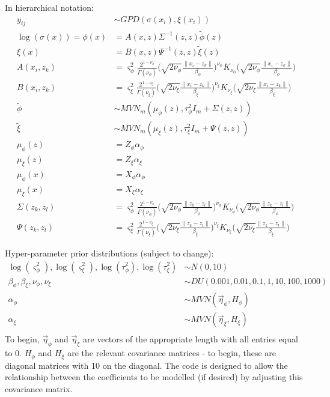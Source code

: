 \documentclass{article}
\begin{document}
In hierarchical notation:
\begin{align*}
y_{ij} &\sim GPD(\sigma(x_i), \xi(x_i)) \\
\log (\sigma (x)) = \phi(x) &= A(x, z) \Sigma^{-1}(z,z) \tilde{\phi}(z) \\
\xi (x) &= B(x, z) \Psi^{-1}(z,z) \tilde{\xi}(z) \\
A(x_i, z_k) &= \varsigma_\phi^2 \frac{2^{1-\nu_\phi}}{\Gamma(\nu_\phi)}\Bigg(\sqrt{2\nu_\phi}\frac{\|x_i - z_k\|}{\beta_\phi}\Bigg)^{\nu_\phi} K_{\nu_\phi}\Bigg(\sqrt{2\nu_\phi}\frac{\|x_i - z_k\|}{\beta_\phi}\Bigg)\\
B(x_i, z_k) &= \varsigma_\xi^2 \frac{2^{1-\nu_\xi}}{\Gamma(\nu_\xi)}\Bigg(\sqrt{2\nu_\xi}\frac{\|x_i - z_k\|}{\beta_\xi}\Bigg)^{\nu_\xi} K_{\nu_\xi}\Bigg(\sqrt{2\nu_\xi}\frac{\|x_i - z_k\|}{\beta_\xi}\Bigg)\\
\tilde{\phi} &\sim MVN_m(\mu_\phi(z), \tau_\phi^2 I_m + \Sigma(z, z))\\
\tilde{\xi} &\sim MVN_m(\mu_\xi(z), \tau_\xi^2 I_m + \Psi(z, z))\\
\mu_\phi (z) &= Z_\phi \alpha_\phi \\
\mu_\xi (z) &= Z_\xi \alpha_\xi \\
\mu_\phi(x) &= X_\phi \alpha_\phi \\
\mu_\xi(x) &= X_\xi \alpha_\xi \\
\Sigma(z_k, z_l) &= \varsigma_\phi^2 \frac{2^{1-\nu_\phi}}{\Gamma(\nu_\phi)}\Bigg(\sqrt{2\nu_\phi}\frac{\|z_k - z_l\|}{\beta_\phi}\Bigg)^{\nu_\phi} K_{\nu_\phi}\Bigg(\sqrt{2\nu_\phi}\frac{\|z_k - z_l\|}{\beta_\phi}\Bigg)\\
\Psi(z_k, z_l) &= \varsigma_\xi^2 \frac{2^{1-\nu_\xi}}{\Gamma(\nu_\xi)}\Bigg(\sqrt{2\nu_\xi}\frac{\|z_k - z_l\|}{\beta_\xi}\Bigg)^{\nu_\xi} K_{\nu_\xi}\Bigg(\sqrt{2\nu_\xi}\frac{\|z_k - z_l\|}{\beta_\xi}\Bigg)
\end{align*}

Hyper-parameter prior distributions (subject to change):
\begin{align*}
\log(\varsigma^2_\phi), \log(\varsigma^2_\xi), \log(\tau^2_\phi), \log(\tau^2_\xi) &\sim N(0, 10) \\
\beta_\phi, \beta_\xi, \nu_\phi, \nu_\xi &\sim DU(0.001, 0.01, 0.1, 1, 10, 100, 1000)\\
\alpha_\phi &\sim MVN(\vec{\eta}_\phi, H_\phi)\\
\alpha_\xi &\sim MVN(\vec{\eta}_\xi, H_\xi)\\
\end{align*}
To begin, $\vec{\eta}_\phi$ and $\vec{\eta}_\xi$ are vectors of the appropriate length with all entries equal to 0. $H_\phi$ and $H_\xi$ are the relevant covariance matrices - to begin, these are diagonal matrices with 10 on the diagonal. The code is designed to allow the relationship between the coefficients to be modelled (if desired) by adjusting this covariance matrix.
\end{document}
